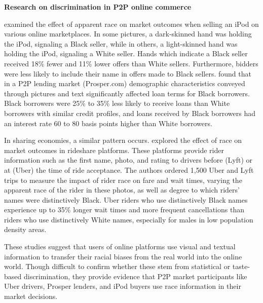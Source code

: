 


\vspace{5mm}
\textbf{Research on discrimination in P2P online commerce}

\cite{doleac} examined the effect of apparent race on market outcomes when selling an iPod on various online marketplaces. In some pictures, a dark-skinned hand was holding the iPod, signaling a Black seller, while in others, a light-skinned hand was holding the iPod, signaling a White seller. Hands which indicate a Black seller received 18\% fewer and 11\% lower offers than White sellers. Furthermore, bidders were less likely to include their name in offers made to Black sellers. \cite{pope} found that in a P2P lending market (Prosper.com) demographic characteristics conveyed through pictures and text significantly affected loan terms for Black borrowers. Black borrowers were 25\% to 35\% less likely to receive loans than White borrowers with similar credit profiles, and loans received by Black borrowers had an interest rate 60 to 80 basis points higher than White borrowers.

In sharing economies, a similar pattern occurs. \cite{knittel} explored the effect of race on market outcomes in rideshare platforms. These platforms provide rider information such as the first name, photo, and rating to drivers before (Lyft) or at (Uber) the time of ride acceptance. The authors ordered 1,500 Uber and Lyft trips to measure the impact of rider race on fare and wait times, varying the apparent race of the rider in these photos, as well as degree to which riders’ names were distinctively Black. Uber riders who use distinctively Black names experience up to 35\% longer wait times and more frequent cancellations than riders who use distinctively White names, especially for males in low population density areas.

These studies suggest that users of online platforms use visual and textual information to transfer their racial biases from the real world into the online world. Though difficult to confirm whether these stem from statistical or taste-based discrimination, they provide evidence that P2P market participants like Uber drivers, Prosper lenders, and iPod buyers use race information in their market decisions. 



